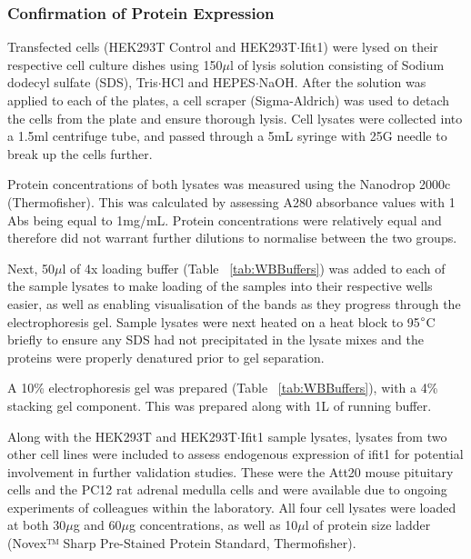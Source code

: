 \subsubsection{Confirmation of Protein Expression}

Transfected cells (HEK293T Control and HEK293T$\cdot$Ifit1) were lysed on their respective cell culture dishes using 150$\mu$l of lysis solution consisting of Sodium dodecyl sulfate (SDS), Tris$\cdot$HCl and HEPES$\cdot$NaOH. After the solution was applied to each of the plates, a cell scraper (Sigma-Aldrich) was used to detach the cells from the plate and ensure thorough lysis. Cell lysates were collected into a 1.5ml centrifuge tube, and passed through a 5mL syringe with 25G needle to break up the cells further. 
	
Protein concentrations of both lysates was measured using the Nanodrop 2000c (Thermofisher). This was calculated by assessing A280 absorbance values with 1 Abs being equal to 1mg/mL. Protein concentrations were relatively equal and therefore did not warrant further dilutions to normalise between the two groups. 

Next, 50$\mu$l of 4x loading buffer (Table ~\ref{tab:WBBuffers}) was added to each of the sample lysates to make loading of the samples into their respective wells easier, as well as enabling visualisation of the bands as they progress through the electrophoresis gel. Sample lysates were next heated on a heat block to 95$\degree$C briefly to ensure any SDS had not precipitated in the lysate mixes and the proteins were properly denatured prior to gel separation. 

A 10\% electrophoresis gel was prepared (Table ~\ref{tab:WBBuffers}), with a 4\% stacking gel component. This was prepared along with 1L of running buffer. 

Along with the HEK293T and HEK293T$\cdot$Ifit1 sample lysates, lysates from two other cell lines were included to assess endogenous expression of ifit1 for potential involvement in further validation studies. These were the Att20 mouse pituitary cells and the PC12 rat adrenal medulla cells and were available due to ongoing experiments of colleagues within the laboratory. All four cell lysates were loaded at both 30$\mu$g and 60$\mu$g concentrations, as well as 10$\mu$l of protein size ladder (Novex™ Sharp Pre-Stained Protein Standard, Thermofisher). 

